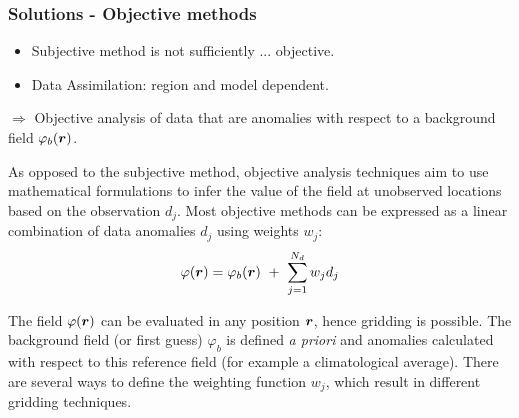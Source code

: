 
\begin{frame}
\frametitle{Solutions - Objective methods}

\begin{itemize}
\item Subjective method is not sufficiently ... objective.
\item Data Assimilation: region and model dependent.
\end{itemize}
$\Rightarrow$ Objective analysis of data that are anomalies with
respect to a background field $\varphi_b(\mbox{\boldmath $ r $})$.

As opposed to the subjective method, objective analysis techniques aim
to use mathematical formulations to infer the value of the field at
unobserved locations based on the observation $d_j$.  Most objective
methods can be expressed as a linear combination of data anomalies
$d_j$ using weights $w_j$:
\vspace{-0.5cm}
\begin{equation}
\varphi(\mbox{\boldmath $ r $}) = \varphi_b(\mbox{\boldmath $ r $}) ~+~ \sum_{j=1}^{N_d} w_j d_j
\end{equation}

The field $\varphi(\mbox{\boldmath $ r $})$ can be evaluated in any position
$\mbox{\boldmath $ r $}$, hence gridding is possible.  The {\color{red}background field (or
first guess)} $\varphi_b$ is defined {\it a priori} and anomalies
calculated with respect to this reference field (for example a
climatological average).  There are several ways to define the
weighting function $w_j$, which result in different gridding
techniques. %

\end{frame}


